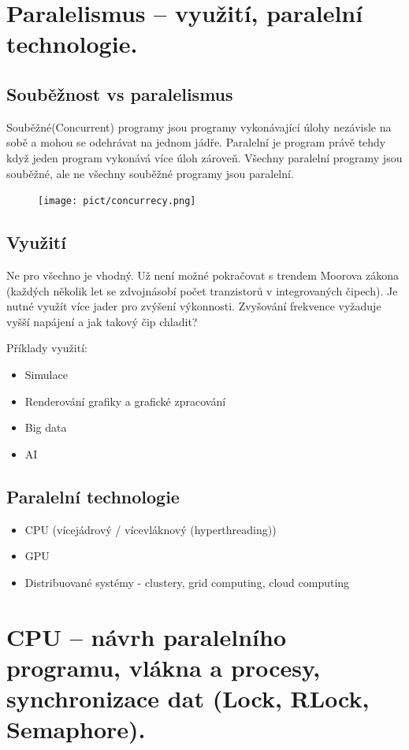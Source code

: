 \section{Paralelismus – využití, paralelní technologie.}
\subsection{Souběžnost vs paralelismus}
Souběžné(Concurrent) programy jsou programy vykonávající úlohy nezávisle na sobě a mohou se odehrávat na jednom jádře.
Paralelní je program právě tehdy když jeden program vykonává více úloh zároveň. Všechny paralelní programy jsou 
souběžné, ale ne všechny souběžné programy jsou paralelní.

\begin{figure}
    \centering
    \texttt{[image: pict/concurrecy.png]}
\end{figure}

\subsection{Využití}
Ne pro všechno je vhodný. Už není možné pokračovat s trendem Moorova zákona (každých několik let se zdvojnásobí počet tranzistorů
v integrovaných čipech). Je nutné využít více jader pro zvýšení výkonnosti. Zvyšování frekvence vyžaduje vyšší napájení a jak 
takový čip chladit?

Příklady využití: 
\begin{itemize}
    \item Simulace
    \item Renderování grafiky a grafické zpracování
    \item Big data
    \item AI
\end{itemize}

\subsection{Paralelní technologie}
\begin{itemize}
    \item CPU (vícejádrový / vícevláknový (hyperthreading))
    \item GPU
    \item Distribuované systémy - clustery, grid computing, cloud computing
\end{itemize}

\section{CPU – návrh paralelního programu, vlákna a procesy, synchronizace dat (Lock, RLock, Semaphore).}
